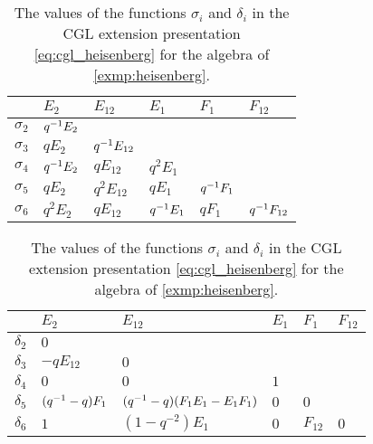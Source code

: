 \begin{example}
\begin{table}
\begin{center}
			\begin{tabular}{c|lllll}
				           & $E_2$       & $E_{12}$       & $E_{1}$     & $F_1$       & $F_{12}$       \\
				\hline
				$\sigma_2$ & $q^{-1} E_2$                                                               \\
				$\sigma_3$ & $q E_2$     & $q^{-1} E_{12}$                                              \\
				$\sigma_4$ & $q^{-1} E_2$ & $q E_{12}$     & $q^2 E_1$                                  \\
				$\sigma_5$ & $q E_2$     & $q^2 E_{12}$   & $q E_1$     & $q^{-1} F_1$                  \\
				$\sigma_6$ & $q^2 E_2$   & $q E_{12}$     & $q^{-1} E_1$ & $q F_1$     & $q^{-1} F_{12}$
			\end{tabular}

			\begin{tabular}{c|lllll}
				           & $E_2$           & $E_{12}$                        & $E_{1}$ & $F_1$    & $F_{12}$ \\
				\hline
				$\delta_2$ & $0$                                                                               \\
				$\delta_3$ & $-q E_{12}$     & $0$                                                             \\
				$\delta_4$ & $0$             & $0$                             & $1$                           \\
				$\delta_5$ & $(q^{-1} -q)F_1$ & $(q^{-1} -q)(F_1 E_1 - E_1 F_1)$ & $0$     & $0$                 \\
				$\delta_6$ & $1$             & $(1- q^{-2})E_1$                & $0$     & $F_{12}$ & $0$
			\end{tabular}

		\end{center}

		\caption{The values of the functions $\sigma_i$ and $\delta_i$ in the CGL extension presentation \cref{eq:cgl_heisenberg} for the algebra of \cref{exmp:heisenberg}. }
		\label{table:sigma_delta_heisenberg}
	\end{table}


\end{example}
